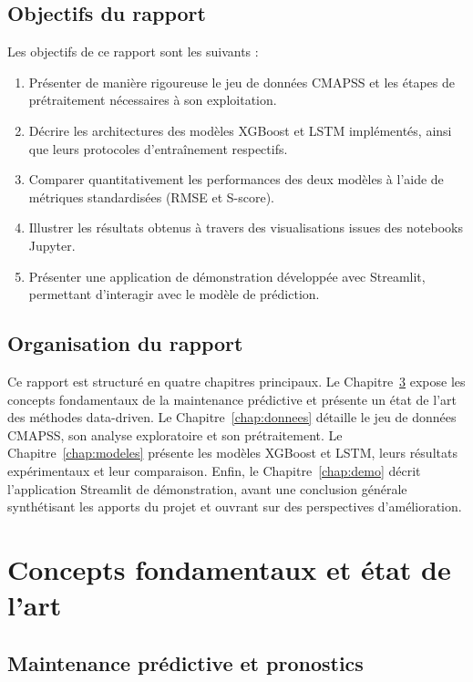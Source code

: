 \documentclass[12pt,a4paper]{report}
\theoremstyle{definition}
\begin{document}
\section{Objectifs du rapport}

Les objectifs de ce rapport sont les suivants :
\begin{enumerate}
    \item Présenter de manière rigoureuse le jeu de données CMAPSS et les étapes de prétraitement nécessaires à son exploitation.
    \item Décrire les architectures des modèles XGBoost et LSTM implémentés, ainsi que leurs protocoles d'entraînement respectifs.
    \item Comparer quantitativement les performances des deux modèles à l'aide de métriques standardisées (RMSE et S-score).
    \item Illustrer les résultats obtenus à travers des visualisations issues des notebooks Jupyter.
    \item Présenter une application de démonstration développée avec Streamlit, permettant d'interagir avec le modèle de prédiction.
\end{enumerate}

\section{Organisation du rapport}

Ce rapport est structuré en quatre chapitres principaux. Le Chapitre~\ref{chap:fondamentaux} expose les concepts fondamentaux de la maintenance prédictive et présente un état de l'art des méthodes data-driven. Le Chapitre~\ref{chap:donnees} détaille le jeu de données CMAPSS, son analyse exploratoire et son prétraitement. Le Chapitre~\ref{chap:modeles} présente les modèles XGBoost et LSTM, leurs résultats expérimentaux et leur comparaison. Enfin, le Chapitre~\ref{chap:demo} décrit l'application Streamlit de démonstration, avant une conclusion générale synthétisant les apports du projet et ouvrant sur des perspectives d'amélioration.

\chapter{Concepts fondamentaux et état de l'art}\label{chap:fondamentaux}

\section{Maintenance prédictive et pronostics}
\end{document}
